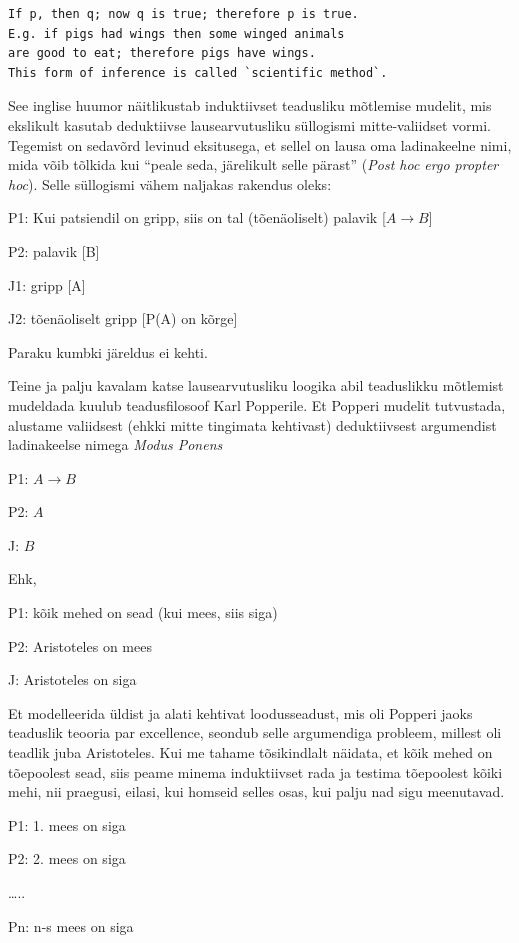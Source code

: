 \documentclass[]{book}
\begin{document}
\begin{verbatim}
If p, then q; now q is true; therefore p is true. 
E.g. if pigs had wings then some winged animals 
are good to eat; therefore pigs have wings. 
This form of inference is called `scientific method`.
\end{verbatim}

See inglise huumor näitlikustab induktiivset teadusliku mõtlemise
mudelit, mis ekslikult kasutab deduktiivse lausearvutusliku süllogismi
mitte-valiidset vormi. Tegemist on sedavõrd levinud eksitusega, et
sellel on lausa oma ladinakeelne nimi, mida võib tõlkida kui ``peale
seda, järelikult selle pärast'' (\emph{Post hoc ergo propter hoc}).
Selle süllogismi vähem naljakas rakendus oleks:

P1: Kui patsiendil on gripp, siis on tal (tõenäoliselt) palavik
{[}\(A \rightarrow B\){]}

P2: palavik {[}B{]}

J1: gripp {[}A{]}

J2: tõenäoliselt gripp {[}P(A) on kõrge{]}

Paraku kumbki järeldus ei kehti.

Teine ja palju kavalam katse lausearvutusliku loogika abil teaduslikku
mõtlemist mudeldada kuulub teadusfilosoof Karl Popperile. Et Popperi
mudelit tutvustada, alustame valiidsest (ehkki mitte tingimata
kehtivast) deduktiivsest argumendist ladinakeelse nimega \emph{Modus
Ponens}

P1: \(A \rightarrow B\)

P2: \(A\)

J: \(B\)

Ehk,

P1: kõik mehed on sead (kui mees, siis siga)

P2: Aristoteles on mees

J: Aristoteles on siga

Et modelleerida üldist ja alati kehtivat loodusseadust, mis oli Popperi
jaoks teaduslik teooria par excellence, seondub selle argumendiga
probleem, millest oli teadlik juba Aristoteles. Kui me tahame
tõsikindlalt näidata, et kõik mehed on tõepoolest sead, siis peame
minema induktiivset rada ja testima tõepoolest kõiki mehi, nii praegusi,
eilasi, kui homseid selles osas, kui palju nad sigu meenutavad.

P1: 1. mees on siga

P2: 2. mees on siga

\ldots{}..

Pn: n-s mees on siga
\end{document}
